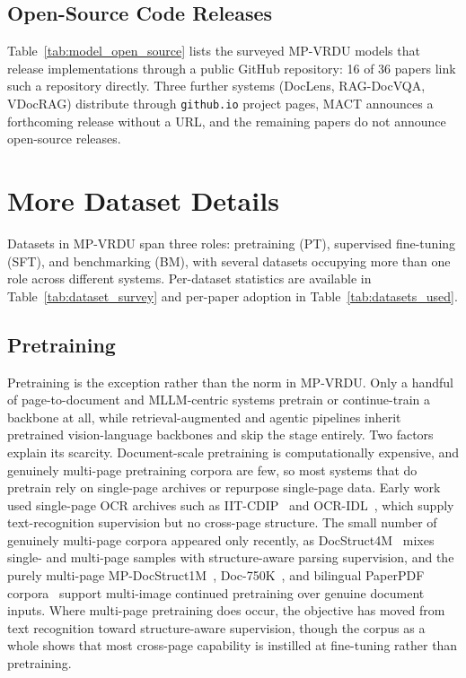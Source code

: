 \documentclass[11pt]{article}
\begin{document}
\subsection{Open-Source Code Releases}
\label{app:open-source}
Table~\ref{tab:model_open_source} lists the surveyed MP-VRDU models that release implementations through a public GitHub repository: 16 of 36 papers link such a repository directly. Three further systems (DocLens, RAG-DocVQA, VDocRAG) distribute through \texttt{github.io} project pages, MACT announces a forthcoming release without a URL, and the remaining papers do not announce open-source releases.

\section{More Dataset Details}
\label{app:dataset-details}
Datasets in MP-VRDU span three roles: pretraining (PT), supervised fine-tuning (SFT), and benchmarking (BM), with several datasets occupying more than one role across different systems. Per-dataset statistics are available in Table~\ref{tab:dataset_survey} and per-paper adoption in Table~\ref{tab:datasets_used}.


\subsection{Pretraining}
\label{app:dataset-pt}
Pretraining is the exception rather than the norm in MP-VRDU. Only a handful of page-to-document and MLLM-centric systems pretrain or continue-train a backbone at all, while retrieval-augmented and agentic pipelines inherit pretrained vision-language backbones and skip the stage entirely. Two factors explain its scarcity. Document-scale pretraining is computationally expensive, and genuinely multi-page pretraining corpora are few, so most systems that do pretrain rely on single-page archives or repurpose single-page data. Early work used single-page OCR archives such as IIT-CDIP~\cite{lewis2006iitcdip} and OCR-IDL~\cite{biten2022ocridl}, which supply text-recognition supervision but no cross-page structure. The small number of genuinely multi-page corpora appeared only recently, as DocStruct4M~\cite{hu2024mplug} mixes single- and multi-page samples with structure-aware parsing supervision, and the purely multi-page MP-DocStruct1M~\cite{hu2025mplug2}, Doc-750K~\cite{duan2025docopilot}, and bilingual PaperPDF corpora~\cite{xie2024wukong} support multi-image continued pretraining over genuine document inputs. Where multi-page pretraining does occur, the objective has moved from text recognition toward structure-aware supervision, though the corpus as a whole shows that most cross-page capability is instilled at fine-tuning rather than pretraining.
\end{document}

